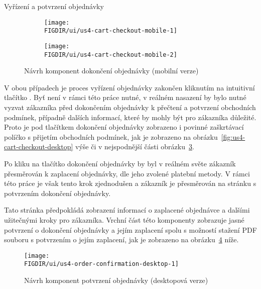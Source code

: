 \begin{subsection}{Vyřízení a potvrzení objednávky}
    \begin{figure}[H]
        \centering
        \begin{subfigure}{0.4\textwidth}
            \texttt{[image: \\FIGDIR/ui/us4-cart-checkout-mobile-1]}
            \label{fig:us4-cart-checkout-mobile-1}
        \end{subfigure}
        \hfill
        \begin{subfigure}{0.4\textwidth}
            \texttt{[image: \\FIGDIR/ui/us4-cart-checkout-mobile-2]}
            \label{fig:us4-cart-checkout-mobile-2}
        \end{subfigure}

        \caption{Návrh komponent dokončení objednávky (mobilní verze)}
        \label{fig:us4-cart-checkout-mobile}
    \end{figure}

    V obou případech je proces vyřízení objednávky zakončen kliknutím na intuitivní tlačítko .
    Byť není v rámci této práce nutné, v reálném nasazení by bylo nutné vyzvat zákazníka před dokončením objednávky k přečtení a potvrzení obchodních podmínek, případně dalších informací, které by mohly být pro zákazníka důležité.
    Proto je pod tlačítkem dokončení objednávky zobrazeno i povinné zaškrtávací políčko s přijetím obchodních podmínek, jak je zobrazeno na obrázku~\ref{fig:us4-cart-checkout-desktop} výše či v nejspodnější části obrázku~\ref{fig:us4-cart-checkout-mobile}.

    Po kliku na tlačítko dokončení objednávky by byl v reálném světe zákazník přesměrován k zaplacení objednávky, dle jeho zvolené platební metody.
    V rámci této práce je však tento krok zjednodušen a zákazník je přesměrován na stránku s potvrzením dokončení objednávky.

    Tato stránka předpokládá zobrazení informací o zaplacené objednávce a dalšími užitečnými kroky pro zákazníka.
    Vrchní část této komponenty zobrazuje jasné potvrzení o dokončení objednávky a jejím zaplacení spolu s možností stažení PDF souboru s potvrzením o jejím zaplacení, jak je zobrazeno na obrázku~\ref{fig:us4-order-confirmation-desktop} níže.

    \begin{figure}[H]
        \centering
        \texttt{[image: \\FIGDIR/ui/us4-order-confirmation-desktop-1]}
        \caption{Návrh komponent potvrzení objednávky (desktopová verze)}
        \label{fig:us4-order-confirmation-desktop}
    \end{figure}


\end{subsection}

